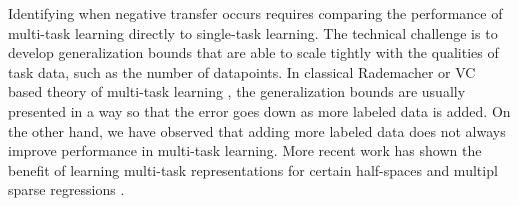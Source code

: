 Identifying when negative transfer occurs requires comparing the performance of multi-task learning directly to single-task learning.
The technical challenge is to develop generalization bounds that are able to scale tightly with the qualities of task data, such as the number of datapoints.
In classical Rademacher or VC based theory of multi-task learning \cite{B00,AZ05,M06}, the generalization bounds are usually presented in a way so that the error goes down as more labeled data is added.
On the other hand, we have observed that adding more labeled data does not always improve performance in multi-task learning.
More recent work has shown the benefit of learning multi-task representations for certain half-spaces \cite{MPR16} and multipl sparse regressions \cite{LPTV09,LPVT11}.




